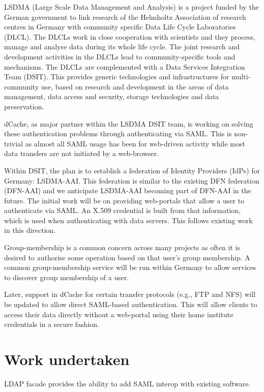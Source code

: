 \documentclass[a4paper]{jpconf}
\begin{document}
LSDMA\cite{lsdma} (Large Scale Data Management and Analysis) is a
project funded by the German government to link research of the
Helmholtz Association of research centres in Germany with community
specific Data Life Cycle Laboratories (DLCL). The DLCLs work in close
cooperation with scientists and they process, manage and analyse data
during its whole life cycle. The joint research and development
activities in the DLCLs lead to community-specific tools and
mechanisms. The DLCLs are complemented with a Data Services
Integration Team (DSIT). This provides generic technologies and
infrastructures for multi-community use, based on research and
development in the areas of data management, data access and security,
storage technologies and data preservation.

dCache, as major partner within the LSDMA DSIT team, is working on
solving these authentication problems through authenticating via SAML.
This is non-trivial as almost all SAML usage has been for web-driven
activity while most data transfers are not initiated by a web-browser.

Within DSIT, the plan is to establish a federation of Identity
Providers (IdPs) for Germany: LSDMA-AAI.  This federation is similar
to the existing DFN federation (DFN-AAI)\cite{dfn-aai-website} and we
anticipate LSDMA-AAI becoming part of DFN-AAI in the future.  The
initial work will be on providing web-portals that allow a user to
authenticate via SAML.  An X.509 credential is built from that
information, which is used when authenticating with data servers.
This follows existing work in this
direction\cite{groeper2007architecture}.

Group-membership is a common concern across many projects as often it
is desired to authorise some operation based on that user's group
membership.  A common group-membership service will be run within
Germany to allow services to discover group membership of a user.

Later, support in dCache for certain transfer protocols (e.g., FTP and
NFS) will be updated to allow direct SAML-based authentication.  This
will allow clients to access their data directly without a web-portal
using their home institute credentials in a secure fashion.


\section{Work undertaken}

LDAP facade provides the ability to add SAML interop with existing
software.
\end{document}
